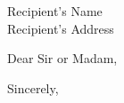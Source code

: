 \documentclass{letter}
\begin{document}
\begin{letter}{Recipient's Name \\ Recipient's Address}

\date{\today} %

\opening{Dear Sir or Madam,}

\lipsum[1] %

\lipsum[2] %

\closing{Sincerely,}

\end{letter}
\end{document}
